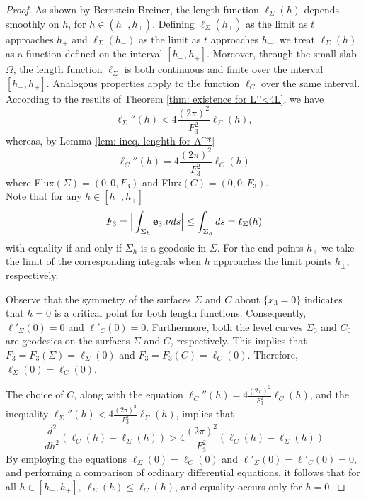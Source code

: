 \documentclass[11pt]{amsart}
\numberwithin{equation}{section}
\theoremstyle{theorem}
\theoremstyle{definition}
\numberwithin{equation}{section}
\begin{document}
\begin{proof}
     As shown by Bernstein-Breiner, the length function $\ell_{\Sigma}(h)$ depends smoothly on $h$, for $h\in (h_- ,h_+ )$. Defining $\ell_{\Sigma}(h_+)$ as the limit as $t$ approaches $h_+$ and $\ell_{\Sigma}(h_-)$ as the limit as $t$ approaches $h_-$, we treat $\ell_{\Sigma}(h)$ as a function defined on the interval $[h_-, h_+]$. Moreover, through the small slab $\Omega$, the length function $\ell_{\Sigma}$ is both continuous and finite over the interval $[h_-,h_+]$. Analogous properties apply to the function $\ell_C$ over the same interval. \\
     According to the results of Theorem \ref{thm: existence for L''<4L}, we have
    $$
    \ell_{\Sigma}''(h)< 4\frac{(2\pi)^2}{F_3^2}\ell_{\Sigma}(h),
    $$
    whereas, by Lemma \ref{lem: ineq. lenghth for A^*}
    $$
    \ell_C''(h)= 4\frac{(2\pi)^2}{F_3^2}\ell_C(h)
    $$
    where Flux$(\Sigma )=(0,0,F_3)$ and Flux$(C)=(0,0,F_3)$. \\
    Note that for any $h\in [h_-,h_+]$
    $$
    F_3=\Big\vert \int_{\Sigma_h}\bold{e}_3.\nu ds \Big\vert \leq \int_{\Sigma_h} ds=\ell_{\Sigma}(h)
    $$
    with equality if and only if $\Sigma_h$ is a geodesic in $\Sigma$. For the end points $h_{\pm}$ we take the limit of the corresponding integrals when $h$ approaches the limit points $h_{\pm}$, respectively.
   \medskip

    Observe that the symmetry of the surfaces $\Sigma$ and $C$ about $\{ x_3=0 \}$ indicates that $h=0$ is a critical point for both length functions. Consequently, $\ell'_{\Sigma}(0)=0$ and $\ell'_{C}(0)=0$. Furthermore, both the level curves $\Sigma_0$ and $C_0$ are geodesics on the surfaces $\Sigma$ and $C$, respectively. This implies that $F_3=F_3(\Sigma)=\ell_{\Sigma}(0)$ and $F_3=F_3(C)=\ell_{C}(0)$. Therefore, $\ell_{\Sigma}(0) = \ell_{C}(0)$.
    \medskip
    
The choice of $C$, along with the equation  $\ell_C''(h)= 4\frac{(2\pi)^2}{F_3^2}\ell_C(h)$, and the inequality $\ell_{\Sigma}''(h)< 4\frac{(2\pi)^2}{F_3^2}\ell_{\Sigma}(h)$, implies that
$$
\frac{d^2}{dh^2}(\ell_C(h)-\ell_{\Sigma}(h))> 4\frac{(2\pi)^2}{F_3^2} (\ell_C(h)-\ell_{\Sigma}(h)) 
$$
By employing the equations $\ell_{\Sigma}(0) = \ell_{C}(0)$ and $\ell'_{\Sigma}(0) = \ell'_{C}(0) =0$, and performing
a comparison of ordinary differential equations, it follows that for all $h\in [h_-,h_+],\  \ell_{\Sigma}(h) \leq \ell_C(h)$, and equality occurs only for $h= 0$. 
\end{proof}
\end{document}
